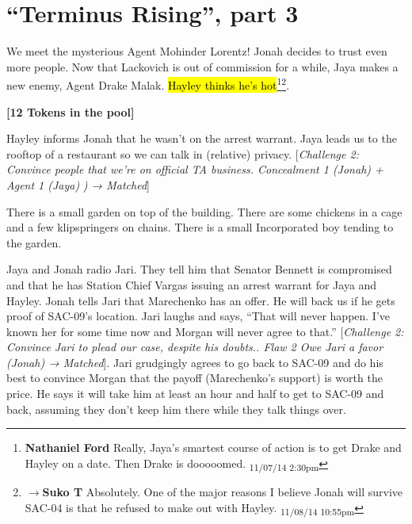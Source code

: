 \setcounter{chapter}{ 28 }
\chapter{\textbf{``Terminus Rising'', part 3} }









We meet the mysterious Agent Mohinder Lorentz!  Jonah decides to trust even more people.  Now that Lackovich is out of commission for a while, Jaya makes a new enemy, Agent Drake Malak. \hl{Hayley thinks he's hot}\footnote{\textbf{Nathaniel Ford }Really, Jaya's smartest course of action is to get Drake and Hayley on a date. Then Drake is dooooomed. \textsubscript{11/07/14 2:30pm}}\footnote{$\rightarrow$\textbf{Suko T }Absolutely.  One of the major reasons I believe Jonah will survive SAC-04 is that he refused to make out with Hayley. \textsubscript{11/08/14 10:55pm}}.






\textbf{{[}12 Tokens in the pool{]}}



Hayley informs Jonah that he wasn't on the arrest warrant.  Jaya leads us to the rooftop of a restaurant so we can talk in (relative) privacy.  {[}\textit{Challenge 2: Convince people that we're on official TA business.  Concealment 1 (Jonah) + Agent 1 (Jaya) }\textit{) → Matched}{]}



There is a small garden on top of the building.  There are some chickens in a cage and a few klipspringers on chains.  There is a small Incorporated boy tending to the garden.



Jaya and Jonah radio Jari.  They tell him that Senator Bennett is compromised and that he has Station Chief Vargas issuing an arrest warrant for Jaya and Hayley.  Jonah tells Jari that Marechenko has an offer.  He will back us if he gets proof of SAC-09's location.  Jari laughs and says, ``That will never happen.  I've known her for some time now and Morgan will never agree to that.''   {[}\textit{Challenge 2: Convince Jari to plead our case, despite his doubts..  Flaw 2 Owe Jari a favor (Jonah) → Matched}{]}.  Jari grudgingly agrees to go back to SAC-09 and do his best to convince Morgan that the payoff (Marechenko's support) is worth the price.  He says it will take him at least an hour and half to get to SAC-09 and back, assuming they don't keep him there while they talk things over.



